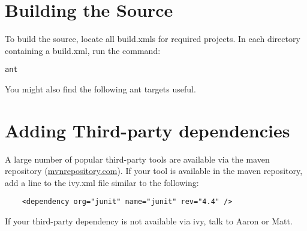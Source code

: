 \documentclass[11pt,fullpage]{article}
\begin{document}
\section{Building the Source}
To build the source, locate all build.xmls for required projects.  In each directory containing a build.xml, run the command:
\begin{verbatim}
ant
\end{verbatim}

You might also find the following ant targets useful.  

\section{Adding Third-party dependencies}
A large number of popular third-party tools are available via the maven repository (\url{mvnrepository.com}).  If your tool is available in the maven repository, add a line to the ivy.xml file similar to the following:
\begin{verbatim}
    <dependency org="junit" name="junit" rev="4.4" />
\end{verbatim}
If your third-party dependency is not available via ivy, talk to Aaron or Matt.
\end{document}
